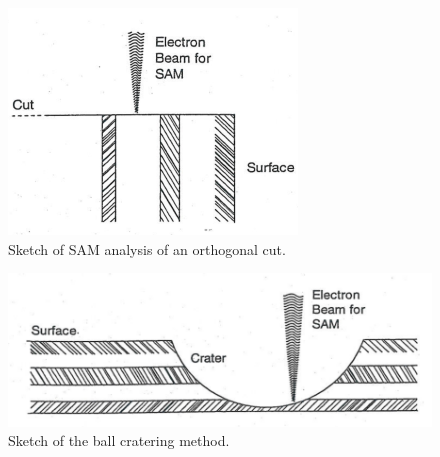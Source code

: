 \begin{figure}[h!]
	\begin{center}
	\includegraphics[scale=3]{figures/07_01.png}
	\caption{Sketch of SAM analysis of an orthogonal cut.}
	\label{fig:samorthcut}
	\end{center}
\end{figure}

\begin{figure}[h!]
	\begin{center}
	\includegraphics[scale=3]{figures/07_02.png}
	\caption{Sketch of the ball cratering method.}
	\label{fig:ballcrater}
	\end{center}
\end{figure}

